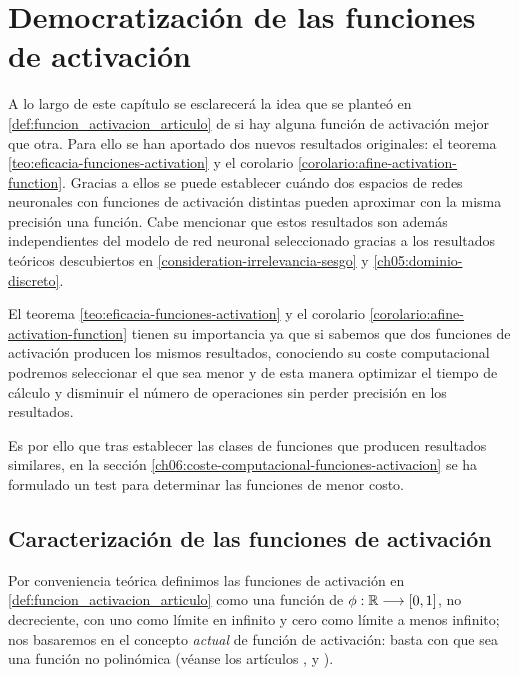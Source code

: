 
\chapter{Democratización de las funciones de activación}
\label{funciones-activacion-democraticas-mas-demoscraticas}
A lo largo de este capítulo se esclarecerá la idea
que se planteó en \ref{def:funcion_activacion_articulo}
de si 
hay alguna función de activación mejor que otra. 
Para ello 
se han aportado dos nuevos resultados originales: 
el teorema \ref{teo:eficacia-funciones-activation} 
y el corolario \ref{corolario:afine-activation-function}.
Gracias a ellos se puede establecer cuándo 
dos espacios de redes neuronales con funciones de activación distintas pueden aproximar
con la misma precisión una función. Cabe mencionar 
que estos resultados son además independientes del modelo de red neuronal seleccionado gracias a los resultados teóricos descubiertos en \ref{consideration-irrelevancia-sesgo} y \ref{ch05:dominio-discreto}.

El teorema \ref{teo:eficacia-funciones-activation} 
y el corolario \ref{corolario:afine-activation-function}  tienen su importancia ya que
si sabemos que dos funciones de activación producen 
los mismos resultados, 
conociendo su coste computacional podremos seleccionar 
el que sea menor y de esta manera optimizar el tiempo 
de cálculo y disminuir el número de operaciones sin 
perder precisión en los resultados.  

Es por ello que 
tras establecer las clases de funciones que producen 
resultados similares, en la sección \ref{ch06:coste-computacional-funciones-activacion}
se ha formulado un test para
determinar las funciones de menor costo. 





\section{Caracterización de las funciones de activación}  

Por conveniencia teórica definimos las funciones de activación en \ref{def:funcion_activacion_articulo}
como una función de $\phi:\mathbb{R} \longrightarrow [0,1]$, no 
decreciente, con uno como límite en infinito y cero como límite a 
menos infinito; nos basaremos en el concepto \textit{actual} de función de activación:
basta con que sea una función no polinómica
(véanse  los artículos \cite{DBLP:journals/corr/SonodaM15}, \cite{modern-trainable-activation-functions} y \cite{FUNAHASHI1989183}).

